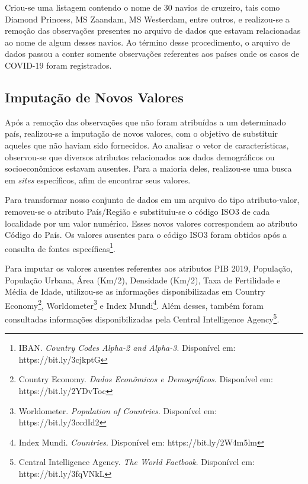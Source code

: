 \documentclass{ieeeaccess}
\begin{document}
Criou-se uma listagem contendo o nome de 30 navios de cruzeiro, tais como Diamond Princess, MS Zaandam, MS Westerdam, entre outros, e realizou-se a remoção das observações presentes no arquivo de dados que estavam relacionadas ao nome de algum desses navios. Ao término desse procedimento, o arquivo de dados passou a conter somente observações referentes aos países onde os casos de COVID-19 foram registrados.

\subsection{Imputação de Novos Valores}

Após a remoção das observações que não foram atribuídas a um determinado país, realizou-se a imputação de novos valores, com o objetivo de substituir aqueles que não haviam sido fornecidos. Ao analisar o vetor de características, observou-se que diversos atributos relacionados aos dados demográficos ou socioeconômicos estavam ausentes. Para a maioria deles, realizou-se uma busca em \textit{sites} específicos, afim de encontrar seus valores. 

Para transformar nosso conjunto de dados em um arquivo do tipo atributo-valor, removeu-se o atributo País/Região e substituiu-se o código ISO3 de cada localidade por um valor numérico. Esses novos valores correspondem ao atributo Código do País. Os valores ausentes para o código ISO3 foram obtidos após a consulta de fontes específicas\footnote{IBAN. \textit{Country Codes Alpha-2 and Alpha-3}. Disponível em: https://bit.ly/3cjkptG}. 

Para imputar os valores ausentes referentes aos atributos PIB 2019, População, População Urbana, Área (Km/2), Densidade (Km/2), Taxa de Fertilidade e Média de Idade, utilizou-se as informações disponibilizadas em Country Economy\footnote{Country Economy. \textit{Dados Econômicos e Demográficos}. Disponível em: https://bit.ly/2YDvToc}, Worldometer\footnote{Worldometer. \textit{Population of Countries}. Disponível em: https://bit.ly/3ccdId2} e Index Mundi\footnote{Index Mundi. \textit{Countries}. Disponível em: https://bit.ly/2W4m5lm}. Além desses, também foram consultadas informações disponibilizadas pela Central Intelligence Agency\footnote{Central Intelligence Agency. \textit{The World Factbook}. Disponível em: https://bit.ly/3fqVNkL}. 
\end{document}
